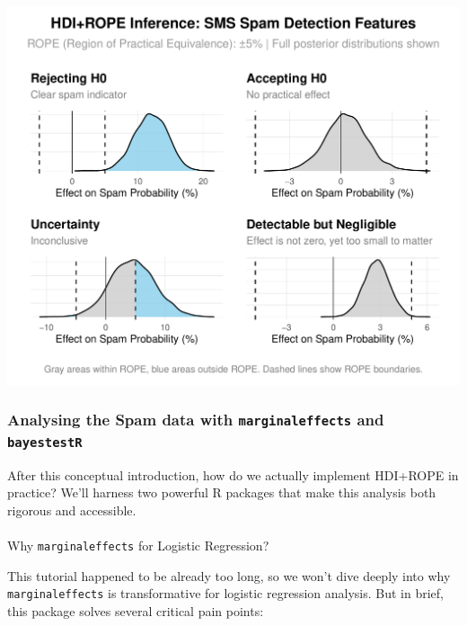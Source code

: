\documentclass[
  letterpaper,
  DIV=11,
  numbers=noendperiod]{scrartcl}
\makeatletter
\let\oldparagraph\paragraph
\renewcommand{\paragraph}{
    \@ifstar
      \xxxParagraphStar
      \xxxParagraphNoStar
  }
\newcommand{\xxxParagraphStar}[1]{\oldparagraph*{#1}\mbox{}}
\newcommand{\xxxParagraphNoStar}[1]{\oldparagraph{#1}\mbox{}}
\makeatother
\begin{document}
\begin{center}
\includegraphics[width=1\linewidth,height=\textheight,keepaspectratio]{Beyond!!!_files/figure-pdf/unnamed-chunk-10-1.pdf}
\end{center}

\subsubsection{\texorpdfstring{Analysing the Spam data with
\texttt{marginaleffects} and
\texttt{bayestestR}}{Analysing the Spam data with marginaleffects and bayestestR}}\label{analysing-the-spam-data-with-marginaleffects-and-bayestestr}

After this conceptual introduction, how do we actually implement
HDI+ROPE in practice? We'll harness two powerful R packages that make
this analysis both rigorous and accessible.

\paragraph{\texorpdfstring{Why \texttt{marginaleffects} for Logistic
Regression?}{Why marginaleffects for Logistic Regression?}}\label{why-marginaleffects-for-logistic-regression}

This tutorial happened to be already too long, so we won't dive deeply
into why \texttt{marginaleffects} is transformative for logistic
regression analysis. But in brief, this package solves several critical
pain points:
\end{document}
